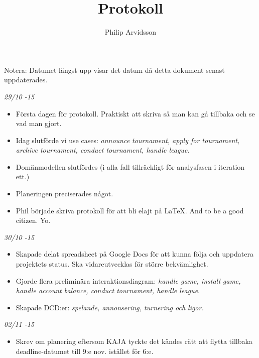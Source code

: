 \documentclass{article}
\title{Protokoll}
\author{Philip Arvidsson}
\begin{document}
    \maketitle

    Notera: Datumet längst upp visar det datum då detta dokument senast
            uppdaterades.

    \vspace{1.5cm}

    {\large \textit{29/10 -15}}
    \begin{itemize}
        \item Första dagen för protokoll. Praktiskt att skriva så man kan
              gå tillbaka och se vad man gjort.

        \item Idag slutförde vi use cases: \textit{announce tournament,
              apply for tournament, archive tournament, conduct
              tournament, handle league}.

        \item Domänmodellen slutfördes (i alla fall tillräckligt för
              analysfasen i iteration ett.)

        \item Planeringen preciserades något.

        \item Phil började skriva protokoll för att bli elajt på LaTeX.
              And to be a good citizen. Yo.
    \end{itemize}

    {\large \textit{30/10 -15}}
    \begin{itemize}
        \item Skapade delat spreadsheet på Google Docs för att kunna följa
              och uppdatera projektets status. Ska vidareutvecklas för
              större bekvämlighet.

        \item Gjorde flera preliminära interaktionsdiagram: \textit{handle game,
              install game, handle account balance, conduct tournament, handle
              league}.

        \item Skapade DCD:er: \textit{spelande, annonsering, turnering och
              ligor.}
    \end{itemize}

    {\large \textit{02/11 -15}}
    \begin{itemize}
        \item Skrev om planering eftersom KAJA tyckte det kändes rätt att flytta
              tillbaka deadline-datumet till 9:e nov. istället för 6:e.
    \end{itemize}
\end{document}
